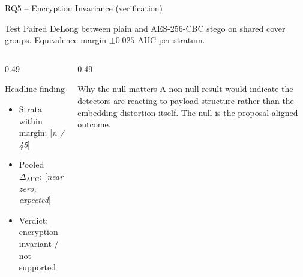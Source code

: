 \documentclass[aspectratio=169,11pt]{beamer}
\begin{document}
\begin{frame}{RQ5 -- Encryption Invariance (verification)}
\small
\begin{block}{Test}
Paired DeLong between plain and AES-256-CBC stego on shared cover groups. Equivalence margin $\pm 0.025$ AUC per stratum.
\end{block}
\begin{columns}[T]
\begin{column}{0.49\textwidth}
\begin{block}{Headline finding}
\begin{itemize}
\item Strata within margin: [\textit{n / 45}]
\item Pooled $\Delta_\text{AUC}$: [\textit{near zero, expected}]
\item Verdict: encryption invariant / not supported
\end{itemize}
\end{block}
\end{column}
\begin{column}{0.49\textwidth}
\begin{block}{Why the null matters}
A non-null result would indicate the detectors are reacting to payload structure rather than the embedding distortion itself. The null is the proposal-aligned outcome.
\end{block}
\end{column}
\end{columns}
\end{frame}

\end{document}

